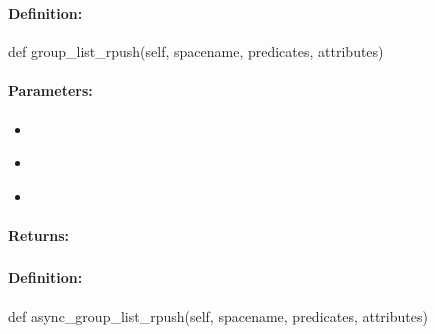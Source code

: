 \pagebreak
\subsubsection{}
\label{api:python:group_list_rpush}


\paragraph{Definition:}
\begin{pythoncode}
def group_list_rpush(self, spacename, predicates, attributes)
\end{pythoncode}

\paragraph{Parameters:}
\begin{itemize}[noitemsep]
\item {}\\

\item {}\\

\item {}\\

\end{itemize}

\paragraph{Returns:}


\pagebreak
\subsubsection{}
\label{api:python:async_group_list_rpush}


\paragraph{Definition:}
\begin{pythoncode}
def async_group_list_rpush(self, spacename, predicates, attributes)
\end{pythoncode}

